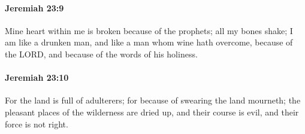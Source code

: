 		\paragraph{Jeremiah 23:9} %
			\label{JEREMIAH-23-9}

			Mine heart within me is broken because of the prophets; all my bones shake; I am like a drunken man, and like a man whom wine hath overcome, because of the LORD, and because of the words of his holiness.


		\paragraph{Jeremiah 23:10} %
			\label{JEREMIAH-23-10}

			For the land is full of adulterers; for because of swearing the land mourneth; the pleasant places of the wilderness are dried up, and their course is evil, and their force is not right.

